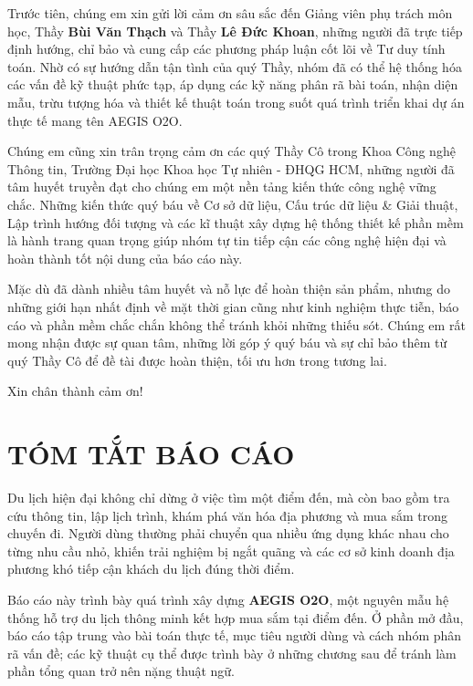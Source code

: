 \documentclass[12pt, a4paper]{article}
\begin{document}
Trước tiên, chúng em xin gửi lời cảm ơn sâu sắc đến Giảng viên phụ trách môn học, Thầy \textbf{Bùi Văn Thạch} và Thầy \textbf{Lê Đức Khoan}, những người đã trực tiếp định hướng, chỉ bảo và cung cấp các phương pháp luận cốt lõi về Tư duy tính toán. Nhờ có sự hướng dẫn tận tình của quý Thầy, nhóm đã có thể hệ thống hóa các vấn đề kỹ thuật phức tạp, áp dụng các kỹ năng phân rã bài toán, nhận diện mẫu, trừu tượng hóa và thiết kế thuật toán trong suốt quá trình triển khai dự án thực tế mang tên AEGIS O2O.

Chúng em cũng xin trân trọng cảm ơn các quý Thầy Cô trong Khoa Công nghệ Thông tin, Trường Đại học Khoa học Tự nhiên - ĐHQG HCM, những người đã tâm huyết truyền đạt cho chúng em một nền tảng kiến thức công nghệ vững chắc. Những kiến thức quý báu về Cơ sở dữ liệu, Cấu trúc dữ liệu \& Giải thuật, Lập trình hướng đối tượng và các kĩ thuật xây dựng hệ thống thiết kế phần mềm là hành trang quan trọng giúp nhóm tự tin tiếp cận các công nghệ hiện đại và hoàn thành tốt nội dung của báo cáo này. 

Mặc dù đã dành nhiều tâm huyết và nỗ lực để hoàn thiện sản phẩm, nhưng do những giới hạn nhất định về mặt thời gian cũng như kinh nghiệm thực tiễn, báo cáo và phần mềm chắc chắn không thể tránh khỏi những thiếu sót. Chúng em rất mong nhận được sự quan tâm, những lời góp ý quý báu và sự chỉ bảo thêm từ quý Thầy Cô để đề tài được hoàn thiện, tối ưu hơn trong tương lai.

Xin chân thành cảm ơn!
\clearpage

\section*{TÓM TẮT BÁO CÁO}
Du lịch hiện đại không chỉ dừng ở việc tìm một điểm đến, mà còn bao gồm tra cứu thông tin, lập lịch trình, khám phá văn hóa địa phương và mua sắm trong chuyến đi. Người dùng thường phải chuyển qua nhiều ứng dụng khác nhau cho từng nhu cầu nhỏ, khiến trải nghiệm bị ngắt quãng và các cơ sở kinh doanh địa phương khó tiếp cận khách du lịch đúng thời điểm.

Báo cáo này trình bày quá trình xây dựng \textbf{AEGIS O2O}, một nguyên mẫu hệ thống hỗ trợ du lịch thông minh kết hợp mua sắm tại điểm đến. Ở phần mở đầu, báo cáo tập trung vào bài toán thực tế, mục tiêu người dùng và cách nhóm phân rã vấn đề; các kỹ thuật cụ thể được trình bày ở những chương sau để tránh làm phần tổng quan trở nên nặng thuật ngữ.
\end{document}
